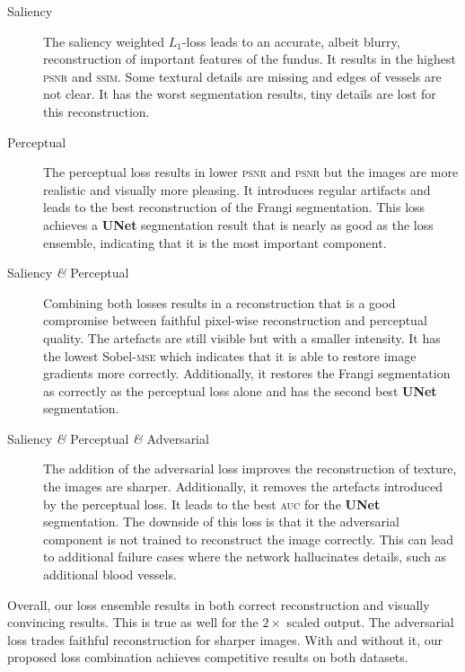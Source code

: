 \documentclass{scrartcl}
\begin{document}
\begin{description}
\item[Saliency] The saliency weighted $L_1$-loss leads to an accurate, albeit blurry, reconstruction of important features of the fundus.
  It results in the highest \textsc{psnr} and \textsc{ssim}.
  Some textural details are missing and edges of vessels are not clear.
  It has the worst segmentation results, tiny details are lost for this reconstruction.
\item[Perceptual] The perceptual loss results in lower \textsc{psnr} and \textsc{psnr} but the images are more realistic and visually more pleasing.
  It introduces regular artifacts and leads to the best reconstruction of the Frangi segmentation.
  This loss achieves a \textbf{UNet} segmentation result that is nearly as good as the loss ensemble, indicating that it is the most important component.
\item[Saliency \textit{\&} Perceptual] Combining both losses results in a reconstruction that is a good compromise between faithful pixel-wise reconstruction and perceptual quality.
  The artefacts are still visible but with a smaller intensity.
  It has the lowest Sobel-\textsc{mse} which indicates that it is able to restore image gradients more correctly.
  Additionally, it restores the Frangi segmentation as correctly as the perceptual loss alone and has the second best \textbf{UNet} segmentation.
\item[Saliency \textit{\&} Perceptual \textit{\&} Adversarial]
  The addition of the adversarial loss improves the reconstruction of texture, the images are sharper.
  Additionally, it removes the artefacts introduced by the perceptual loss.
  It leads to the best \textsc{auc} for the \textbf{UNet} segmentation.
  The downside of this loss is that it the adversarial component is not trained to reconstruct the image correctly.
  This can lead to additional failure cases where the network hallucinates details, such as additional blood vessels.
\end{description}
Overall, our loss ensemble results in both correct reconstruction and visually convincing results.
This is true as well for the $2 \times$ scaled output.
The adversarial loss trades faithful reconstruction for sharper images.
With and without it, our proposed loss combination achieves competitive results on both datasets.
\end{document}
